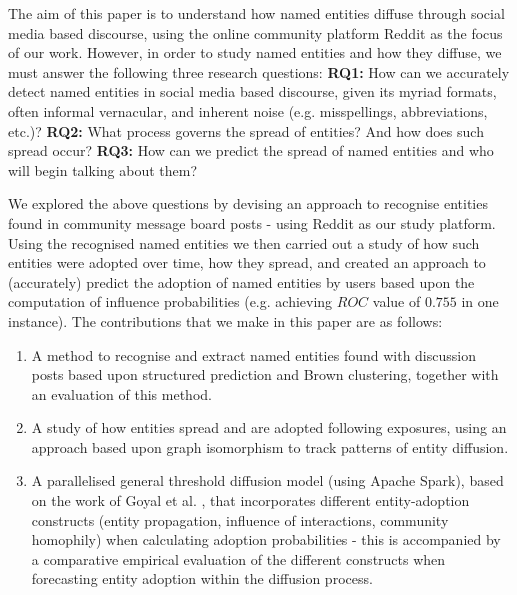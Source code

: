 \documentclass[10pt,journal,compsoc]{IEEEtran}
\begin{document}
The aim of this paper is to understand how named entities diffuse through social media based discourse, using the online community platform Reddit as the focus of our work.
However, in order to study named entities and how they diffuse, we must answer the following three research questions: \textbf{RQ1:} How can we accurately detect named entities in social media based discourse, given its myriad formats, often informal vernacular, and inherent noise (e.g. misspellings, abbreviations, etc.)? \textbf{RQ2:} What process governs the spread of entities? And how does such spread occur? \textbf{RQ3:} How can we predict the spread of named entities and who will begin talking about them?	

We explored the above questions by devising an approach to recognise entities found in community message board posts - using Reddit as our study platform.
Using the recognised named entities we then carried out a study of how such entities were adopted over time, how they spread, and created an approach to (accurately) predict the adoption of named entities by users based upon the computation of influence probabilities (e.g. achieving $ROC$ value of $0.755$ in one instance).
The contributions that we make in this paper are as follows:

\begin{enumerate}
	\item A method to recognise and extract named entities found with discussion posts based upon structured prediction and Brown clustering, together with an evaluation of this method.
	\item A study of how entities spread and are adopted following exposures, using an approach based upon graph isomorphism to track patterns of entity diffusion.
	\item A parallelised general threshold diffusion model (using Apache Spark), based on the work of Goyal et al. \cite{goyal2010learning}, that incorporates different entity-adoption constructs (entity propagation, influence of interactions, community homophily) when calculating adoption probabilities - this is accompanied by a comparative empirical evaluation of the different constructs when forecasting entity adoption within the diffusion process.
\end{enumerate}
\end{document}

